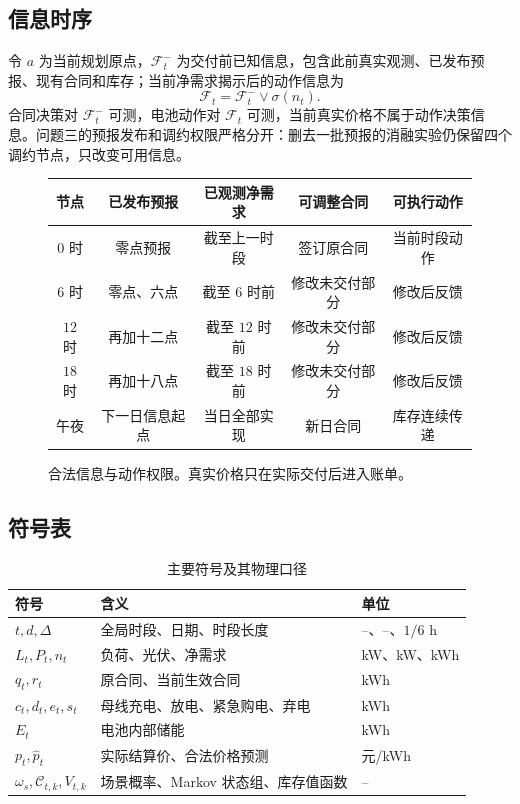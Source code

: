 \documentclass[UTF8,a4paper,zihao=-4,fontset=mac]{ctexart}
\begin{document}
\subsection{信息时序}
令 $a$ 为当前规划原点，$\mathcal F_t^-$ 为交付前已知信息，包含此前真实观测、已发布预报、现有合同和库存；当前净需求揭示后的动作信息为
\begin{equation}
\mathcal F_t=\mathcal F_t^-\vee\sigma(n_t).
\end{equation}
合同决策对 $\mathcal F_t^-$ 可测，电池动作对 $\mathcal F_t$ 可测，当前真实价格不属于动作决策信息。问题三的预报发布和调约权限严格分开：删去一批预报的消融实验仍保留四个调约节点，只改变可用信息。

\begin{figure}[H]
\centering
\begin{tabular}{c|c|c|c|c}
\toprule
节点 & 已发布预报 & 已观测净需求 & 可调整合同 & 可执行动作\\\midrule
$0$ 时 & 零点预报 & 截至上一时段 & 签订原合同 & 当前时段动作\\
$6$ 时 & 零点、六点 & 截至 $6$ 时前 & 修改未交付部分 & 修改后反馈\\
$12$ 时 & 再加十二点 & 截至 $12$ 时前 & 修改未交付部分 & 修改后反馈\\
$18$ 时 & 再加十八点 & 截至 $18$ 时前 & 修改未交付部分 & 修改后反馈\\
午夜 & 下一日信息起点 & 当日全部实现 & 新日合同 & 库存连续传递\\
\bottomrule
\end{tabular}
\caption{合法信息与动作权限。真实价格只在实际交付后进入账单。}
\end{figure}

\subsection{符号表}
\begin{table}[H]\centering\small
\caption{主要符号及其物理口径}
\begin{tabular}{lll}\toprule
符号 & 含义 & 单位\\\midrule
$t,d,\Delta$ & 全局时段、日期、时段长度 & --、--、$1/6$ h\\
$L_t,P_t,n_t$ & 负荷、光伏、净需求 & kW、kW、kWh\\
$q_t,r_t$ & 原合同、当前生效合同 & kWh\\
$c_t,d_t,e_t,s_t$ & 母线充电、放电、紧急购电、弃电 & kWh\\
$E_t$ & 电池内部储能 & kWh\\
$p_t,\widehat p_t$ & 实际结算价、合法价格预测 & 元/kWh\\
$\omega_s,\mathcal C_{t,k},V_{t,k}$ & 场景概率、Markov 状态组、库存值函数 & --\\
\bottomrule\end{tabular}
\end{table}
\end{document}
